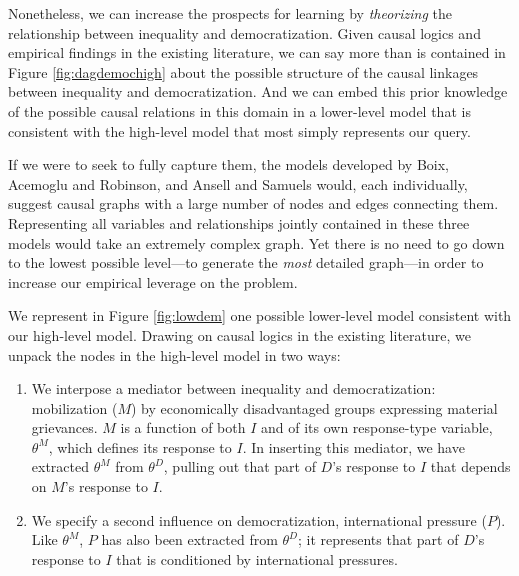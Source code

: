 \documentclass[
  12pt,
]{book}
\begin{document}
Nonetheless, we can increase the prospects for learning by \emph{theorizing} the relationship between inequality and democratization. Given causal logics and empirical findings in the existing literature, we can say more than is contained in Figure \ref{fig:dagdemochigh} about the possible structure of the causal linkages between inequality and democratization. And we can embed this prior knowledge of the possible causal relations in this domain in a lower-level model that is consistent with the high-level model that most simply represents our query.

If we were to seek to fully capture them, the models developed by Boix, Acemoglu and Robinson, and Ansell and Samuels would, each individually, suggest causal graphs with a large number of nodes and edges connecting them. Representing all variables and relationships jointly contained in these three models would take an extremely complex graph. Yet there is no need to go down to the lowest possible level---to generate the \emph{most} detailed graph---in order to increase our empirical leverage on the problem.

We represent in Figure \ref{fig:lowdem} one possible lower-level model consistent with our high-level model. Drawing on causal logics in the existing literature, we unpack the nodes in the high-level model in two ways:

\begin{enumerate}
\def\labelenumi{\arabic{enumi}.}
\item
  We interpose a mediator between inequality and democratization: mobilization (\(M\)) by economically disadvantaged groups expressing material grievances. \(M\) is a function of both \(I\) and of its own response-type variable, \(\theta^M\), which defines its response to \(I\). In inserting this mediator, we have extracted \(\theta^M\) from \(\theta^D\), pulling out that part of \(D\)'s response to \(I\) that depends on \(M\)'s response to \(I\).
\item
  We specify a second influence on democratization, international pressure (\(P\)). Like \(\theta^M\), \(P\) has also been extracted from \(\theta^D\); it represents that part of \(D\)'s response to \(I\) that is conditioned by international pressures.
\end{enumerate}
\end{document}
